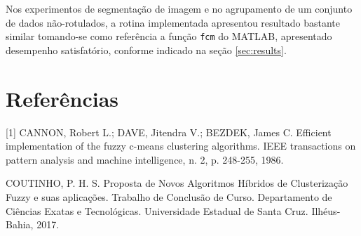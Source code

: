 \documentclass[12pt,a4paper]{article}
\numberwithin{equation}{section}
\begin{document}
\noindent Nos experimentos de segmentação de imagem e no agrupamento de um conjunto de dados não-rotulados, a rotina implementada apresentou resultado bastante similar tomando-se como referência a função \texttt{fcm} do MATLAB\textcopyright, apresentado desempenho satisfatório, conforme indicado na seção \ref{sec:results}.

\newpage

\section*{Referências}
%


[1] CANNON, Robert L.; DAVE, Jitendra V.; BEZDEK, James C. Efficient implementation of the fuzzy c-means clustering algorithms. IEEE transactions on pattern analysis and machine intelligence, n. 2, p. 248-255, 1986.


\noindent [2] COUTINHO, P. H. S. Proposta de Novos Algoritmos Híbridos de Clusterização Fuzzy e suas aplicações. Trabalho de Conclusão de Curso. Departamento de Ciências Exatas e Tecnológicas. Universidade Estadual de Santa Cruz. Ilhéus-Bahia, 2017.
\end{document}
